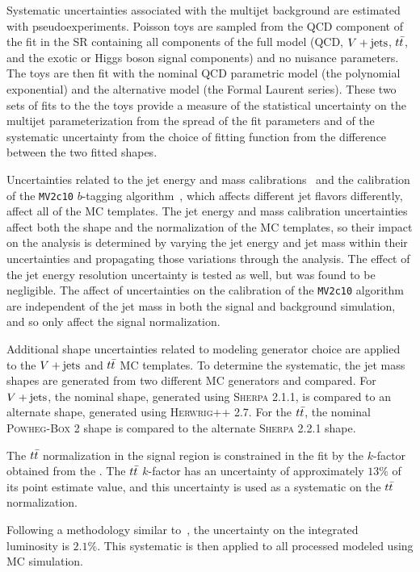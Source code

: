 Systematic uncertainties associated with the multijet background are estimated with pseudoexperiments.
Poisson toys are sampled from the QCD component of the fit in the SR containing all components of the full model (QCD, $V + \text{jets}$, $t\bar{t}$, and the exotic or Higgs boson signal components) and no nuisance parameters.
The toys are then fit with the nominal QCD parametric model (the polynomial exponential) and the alternative model (the Formal Laurent series).
These two sets of fits to the the toys provide a measure of the statistical uncertainty on the multijet parameterization from the spread of the fit parameters and of the systematic uncertainty from the choice of fitting function from the difference between the two fitted shapes.

Uncertainties related to the \largeR{} jet energy and mass calibrations~\cite{JETM-2018-02} and the calibration of the \texttt{MV2c10} $b$-tagging algorithm~\cite{PERF-2016-05}, which affects different jet flavors differently, affect all of the MC templates.
The \largeR{} jet energy and mass calibration uncertainties affect both the shape and the normalization of the MC templates, so their impact on the analysis is determined by varying the jet energy and jet mass within their uncertainties and propagating those variations through the analysis.
The effect of the jet energy resolution uncertainty is tested as well, but was found to be negligible.
The affect of uncertainties on the calibration of the \texttt{MV2c10} algorithm are independent of the \largeR{} jet mass in both the signal and background simulation, and so only affect the signal normalization.

Additional shape uncertainties related to modeling generator choice are applied to the $V + \text{jets}$ and $t\bar{t}$ MC templates.
To determine the systematic, the \largeR{} jet mass shapes are generated from two different MC generators and compared.
For $V + \text{jets}$, the nominal shape, generated using \textsc{Sherpa} 2.1.1, is compared to an alternate shape, generated using \textsc{Herwrig++} 2.7.
For the $t\bar{t}$, the nominal \textsc{Powheg-Box} 2 shape is compared to the alternate \textsc{Sherpa} 2.2.1 shape.

The $t\bar{t}$ normalization in the signal region is constrained in the fit by the $k$-factor obtained from the \CRttbar{}.
The $t\bar{t}$ $k$-factor has an uncertainty of approximately $13\%$ of its point estimate value, and this uncertainty is used as a systematic on the $t\bar{t}$ normalization.

Following a methodology similar to~\cite{DAPR-2011-01}, the uncertainty on the integrated luminosity is $2.1\%$.
This systematic is then applied to all processed modeled using MC simulation.

